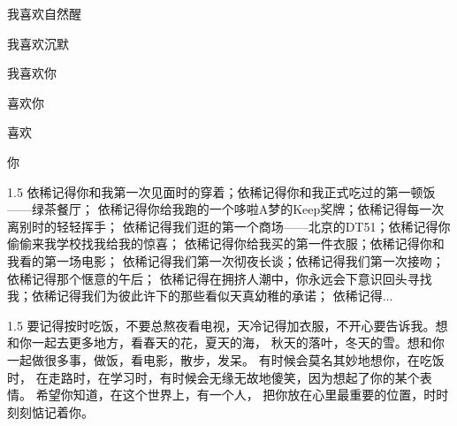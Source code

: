 \begin{flushleft}
    我喜欢自然醒 \par \hspace*{0.5cm} \vspace*{5pt}
    我喜欢沉默 \par \hspace*{0.5cm} \vspace*{5pt}
    我喜欢你 \par \hspace*{0.5cm} \vspace*{5pt}
    喜欢你 \par \hspace*{0.5cm} \vspace*{5pt}
    喜欢  \par \hspace*{0.5cm} \vspace*{5pt}
    你
\end{flushleft}


\clearpage 

\subtitle{点点滴滴}

\large
\begin{spacing}{1.5}
    依稀记得你和我第一次见面时的穿着；依稀记得你和我正式吃过的第一顿饭——绿茶餐厅；
    依稀记得你给我跑的一个哆啦A梦的Keep奖牌；依稀记得每一次离别时的轻轻挥手；
    依稀记得我们逛的第一个商场——北京的DT51；依稀记得你偷偷来我学校找我给我的惊喜；
    依稀记得你给我买的第一件衣服；依稀记得你和我看的第一场电影；
    依稀记得我们第一次彻夜长谈；依稀记得我们第一次接吻；依稀记得那个惬意的午后；
    依稀记得在拥挤人潮中，你永远会下意识回头寻找我；依稀记得我们为彼此许下的那些看似天真幼稚的承诺；
    依稀记得...

\end{spacing}

\clearpage

\subtitle{碎碎念}

\large   
\begin{spacing}{1.5}
    要记得按时吃饭，不要总熬夜看电视，天冷记得加衣服，不开心要告诉我。想和你一起去更多地方，看春天的花，夏天的海，
    秋天的落叶，冬天的雪。想和你一起做很多事，做饭，看电影，散步，发呆。 有时候会莫名其妙地想你，在吃饭时，
    在走路时，在学习时，有时候会无缘无故地傻笑，因为想起了你的某个表情。 希望你知道，在这个世界上，有一个人，
    把你放在心里最重要的位置，时时刻刻惦记着你。


\end{spacing}
    
